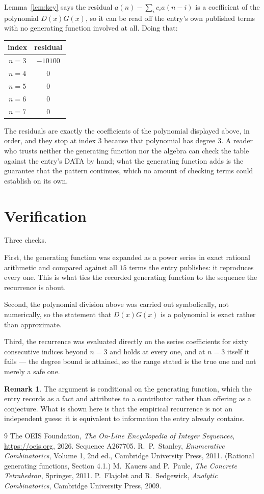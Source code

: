 \documentclass[11pt,a4paper]{article}
\theoremstyle{plain}
\theoremstyle{definition}
\newtheorem{remark}[theorem]{Remark}
\begin{document}
Lemma~\ref{lem:key} says the residual $a(n)-\sum_ic_ia(n-i)$ is a coefficient of the
polynomial $D(x)G(x)$, so it can be read off the entry's own published terms with no
generating function involved at all. Doing that:
\begin{center}
\begin{tabular}{cc}
index & residual \\ \hline
$n=3$ & $-10100$ \\
$n=4$ & $0$ \\
$n=5$ & $0$ \\
$n=6$ & $0$ \\
$n=7$ & $0$
\end{tabular}
\end{center}
The residuals are exactly the coefficients of the polynomial displayed above, in order, and
they stop at index $3$ because that polynomial has degree $3$. A reader who trusts
neither the generating function nor the algebra can check the table against the entry's DATA
by hand; what the generating function adds is the guarantee that the pattern continues, which
no amount of checking terms could establish on its own.

\section{Verification}

Three checks.

First, the generating function was expanded as a power series in exact rational arithmetic and
compared against all $15$ terms the entry publishes: it reproduces every one. This is
what ties the recorded generating function to the sequence the recurrence is about.

Second, the polynomial division above was carried out symbolically, not numerically, so the
statement that $D(x)G(x)$ is a polynomial is exact rather than approximate.

Third, the recurrence was evaluated directly on the series coefficients for sixty consecutive
indices beyond $n=3$ and holds at every one, and at $n=3$ itself it fails --- the
degree bound is attained, so the range stated is the true one and not merely a safe one.

\begin{remark}
The argument is conditional on the generating function, which the entry records as a fact and
attributes to a contributor rather than offering as a conjecture. What is shown here is that
the empirical recurrence is not an independent guess: it is equivalent to information the
entry already contains.
\end{remark}

\begin{thebibliography}{9}
 The OEIS Foundation, \emph{The On-Line Encyclopedia of Integer
Sequences}, \url{https://oeis.org}, 2026. Sequence A267705.
 R.~P.~Stanley, \emph{Enumerative Combinatorics}, Volume 1, 2nd ed.,
Cambridge University Press, 2011. (Rational generating functions, Section 4.1.)
 M.~Kauers and P.~Paule, \emph{The Concrete Tetrahedron}, Springer, 2011.
 P.~Flajolet and R.~Sedgewick, \emph{Analytic Combinatorics}, Cambridge
University Press, 2009.
\end{thebibliography}
\end{document}
